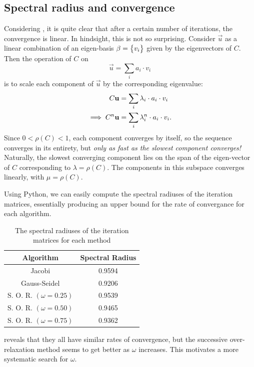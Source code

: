 \documentclass[12pt]{article}
\begin{document}
\begin{multicols*}{2}
    \subsection{Spectral radius and convergence}
    Considering ,
    it is quite clear that after a certain number of iterations,
    the convergence is linear.
    In hindsight, this is not so surprising.
    Consider $\vec u$ as a linear combination of an eigen-basis
    $\beta = \Seq{v_i}$
    given by the eigenvectors of $C$.
    Then the operation of $C$ on
    \[
        \vec u = \sum_i a_i \cdot v_i
    \]
    is to scale each component of $\vec u$ by the corresponding eigenvalue:
    \begin{align*}
        C \vec u &= \sum_i \lambda_i \cdot a_i \cdot v_i \\
        \implies C^n \vec u &= \sum_i \lambda_i^n \cdot a_i \cdot v_i
        \text.
    \end{align*}
    Since $0 < \rho(C) < 1$, each component converges by itself,
    so the sequence converges in its entirety, but
    {\em only as fast as the slowest component converges!}
    Naturally, the slowest converging component lies on the span
    of the eigen-vector of $C$ corresponding to $\lambda = \rho(C)$.
    The components in this subspace converges linearly,
    with $\mu = \rho(C)$.

    Using Python, we can easily compute the spectral radiuses
    of the iteration matrices, essentially producing an upper bound
    for the rate of convergance for each algorithm.
    \begin{table}[H]
        \centering
        \caption{The spectral radiuses of the iteration matrices for each method}
        \begin{tabular}{c S[table-format=1.6]}
            \hline\hline
            \bfseries Algorithm & \bfseries Spectral Radius \\
            \hline
            Jacobi                     & 0.9594 \\
            Gauss-Seidel               & 0.9206 \\
            S. O. R. $(\omega = 0.25)$ & 0.9539 \\
            S. O. R. $(\omega = 0.50)$ & 0.9465 \\
            S. O. R. $(\omega = 0.75)$ & 0.9362 \\
            \hline
        \end{tabular}
        \label{table:rhos}
    \end{table}\noindent
     reveals that they all have similar rates of convergence,
    but the successive over-relaxation method seems to get better as $\omega$
    increases.
    This motivates a more systematic search for $\omega$.


\end{multicols*}
\end{document}

